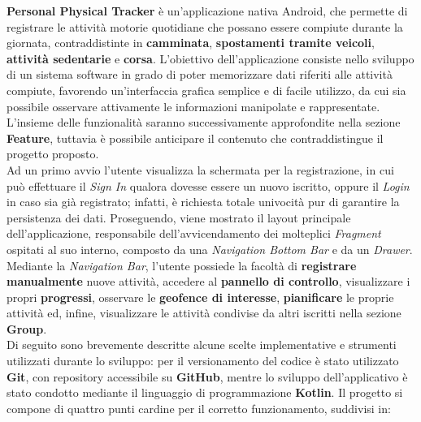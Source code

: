 \documentclass{article}
\begin{document}
    \textbf{Personal Physical Tracker} è un'applicazione nativa Android, che permette di registrare le attività motorie quotidiane che possano essere compiute durante la giornata,
    contraddistinte in \textbf{camminata}, \textbf{spostamenti tramite veicoli}, \textbf{attività sedentarie} e \textbf{corsa}.
    L'obiettivo dell'applicazione consiste nello sviluppo di un sistema software in grado di poter memorizzare dati riferiti alle attività compiute, favorendo un'interfaccia 
    grafica semplice e di facile utilizzo, da cui sia possibile osservare attivamente le informazioni manipolate e rappresentate.
    L'insieme delle funzionalità saranno successivamente approfondite nella sezione \textbf{Feature}, tuttavia è possibile anticipare il contenuto che contraddistingue il progetto
    proposto. \vspace*{7pt}\\
    Ad un primo avvio l'utente visualizza la schermata per la registrazione, in cui può effettuare il \textit{Sign In} qualora dovesse essere un nuovo iscritto, oppure il 
    \textit{Login} in caso sia già registrato; infatti, è richiesta totale univocità pur di garantire la persistenza dei dati. 
    Proseguendo, viene mostrato il layout principale dell'applicazione, responsabile dell'avvicendamento dei molteplici \textit{Fragment} ospitati al suo interno, composto da una
    \textit{Navigation Bottom Bar} e da un \textit{Drawer}. Mediante la \textit{Navigation Bar}, l'utente possiede la facoltà di \textbf{registrare manualmente} nuove attività, 
    accedere al \textbf{pannello di controllo}, visualizzare i propri \textbf{progressi}, osservare le \textbf{geofence di interesse}, \textbf{pianificare} le proprie attività ed,
    infine, visualizzare le attività condivise da altri iscritti nella sezione \textbf{Group}. \vspace{7pt}\\
    Di seguito sono brevemente descritte alcune scelte implementative e strumenti utilizzati durante lo sviluppo: per il versionamento del codice è stato utilizzato \textbf{Git},
    con repository accessibile su \textbf{GitHub}, mentre lo sviluppo dell'applicativo è stato condotto mediante il linguaggio di programmazione \textbf{Kotlin}. Il progetto si 
    compone di quattro punti cardine per il corretto funzionamento, suddivisi in:
\end{document}
